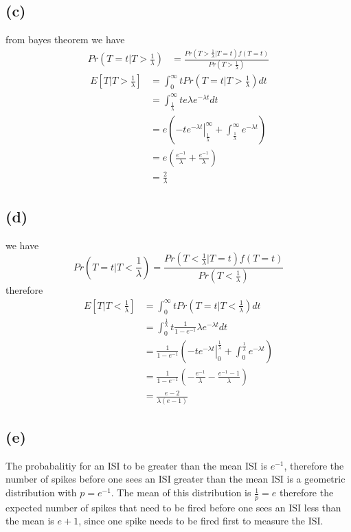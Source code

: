 \documentclass[12pt]{article}
\begin{document}
\subsection*{(c)}
from bayes theorem we have
\begin{align*}
    Pr\left(T=t|T>\frac{1}{\lambda}\right)&=\frac{Pr(T>\frac{1}{\lambda}|T=t)f(T=t)}{Pr(T>\frac{1}{\lambda})} 
\end{align*}
\begin{align*}
    E[T|T>\frac{1}{\lambda}]&=\int_{0}^{\infty}tPr\left(T=t|T>\frac{1}{\lambda}\right)dt\\
    &=\int_{\frac{1}{\lambda}}^{\infty}te \lambda e^{-\lambda t} dt\\
    &=e\left(\left. -te^{-\lambda t}\right|_{\frac{1}{\lambda}}^{\infty}+
    \int_{\frac{1}{\lambda}}^{\infty}e^{-\lambda t}\right)\\
    &=e\left(\frac{e^{-1}}{\lambda}+\frac{e^{-1}}{\lambda}\right)\\
    &=\boxed{\frac{2}{\lambda}}
\end{align*}

\subsection*{(d)}
we have
$$Pr\left(T=t|T<\frac{1}{\lambda}\right)=\frac{Pr(T<\frac{1}{\lambda}|T=t)f(T=t)}{Pr(T<\frac{1}{\lambda})}$$
therefore
\begin{align*}
    E\left[T|T<\frac{1}{\lambda}\right]&=\int_{0}^{\infty}tPr\left(T=t|T<\frac{1}{\lambda}\right)dt\\
    &=\int_{0}^{\frac{1}{\lambda}}t\frac{1}{1-e^{-1}} \lambda e^{-\lambda t} dt\\
    &=\frac{1}{1-e^{-1}}\left(\left. -te^{-\lambda t}\right|_{0}^{\frac{1}{\lambda}}+
    \int_{0}^{\frac{1}{\lambda}}e^{-\lambda t}\right)\\
    &=\frac{1}{1-e^{-1}}\left(-\frac{e^{-1}}{\lambda}-\frac{e^{-1}-1}{\lambda}\right)\\
    &=\boxed{\frac{e-2}{\lambda(e-1)}}
\end{align*}
\subsection*{(e)}
The probabalitiy for an ISI to be greater than the mean ISI is $e^{-1}$, therefore the 
number of spikes before one sees an ISI greater than the mean ISI is a geometric distribution
with $p=e^{-1}$. The mean of this distribution is $\frac{1}{p}=e$ therefore the expected number of spikes
that need to be fired before one sees an ISI less than the mean is $\boxed{e+1}$, since one spike needs to be fired first to measure the ISI.
\end{document}
